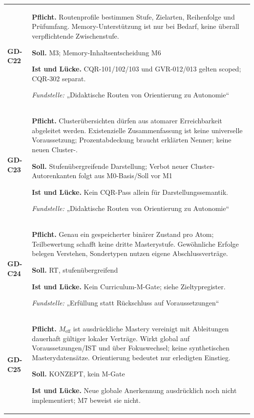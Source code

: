 \begin{longtable}{@{}P{20mm}P{128mm}@{}}
\label{rule:GD-C22}\textbf{GD-C22} &
\textbf{Pflicht.} Routenprofile bestimmen Stufe, Zielarten, Reihenfolge und Prüfumfang. Memory-Unterstützung ist nur bei Bedarf, keine überall verpflichtende Zwischenstufe.\par\smallskip
\textbf{Soll.} M3; Memory-Inhaltsentscheidung M6\par\smallskip
\textbf{Ist und Lücke.} CQR-101/102/103 und GVR-012/013 gelten scoped; CQR-302 separat.\par\smallskip
\emph{Fundstelle:} „Didaktische Routen von Orientierung zu Autonomie“\\\addlinespace[5pt]
\label{rule:GD-C23}\textbf{GD-C23} &
\textbf{Pflicht.} Clusterübersichten dürfen aus atomarer Erreichbarkeit abgeleitet werden. Existenzielle Zusammenfassung ist keine universelle Voraussetzung; Prozentabdeckung braucht erklärten Nenner; keine neuen Cluster-.\par\smallskip
\textbf{Soll.} Stufenübergreifende Darstellung; Verbot neuer Cluster-Autorenkanten folgt aus M0-Basis/Soll vor M1\par\smallskip
\textbf{Ist und Lücke.} Kein CQR-Pass allein für Darstellungssemantik.\par\smallskip
\emph{Fundstelle:} „Didaktische Routen von Orientierung zu Autonomie“\\\addlinespace[5pt]
\label{rule:GD-C24}\textbf{GD-C24} &
\textbf{Pflicht.} Genau ein gespeicherter binärer Zustand pro Atom; Teilbewertung schafft keine dritte Masterystufe. Gewöhnliche Erfolge belegen Verstehen, Sondertypen nutzen eigene Abschlussverträge.\par\smallskip
\textbf{Soll.} RT, stufenübergreifend\par\smallskip
\textbf{Ist und Lücke.} Kein Curriculum-M-Gate; siehe Zieltypregister.\par\smallskip
\emph{Fundstelle:} „Erfüllung statt Rückschluss auf Voraussetzungen“\\\addlinespace[5pt]
\label{rule:GD-C25}\textbf{GD-C25} &
\textbf{Pflicht.} \(M_{\mathrm{eff}}\) ist ausdrückliche Mastery vereinigt mit Ableitungen dauerhaft gültiger lokaler Verträge. Wirkt global auf Voraussetzungen/IST und über Fokuswechsel; keine synthetischen Masterydatensätze. Orientierung bedeutet nur erledigten Einstieg.\par\smallskip
\textbf{Soll.} KONZEPT, kein M-Gate\par\smallskip
\textbf{Ist und Lücke.} Neue globale Anerkennung ausdrücklich noch nicht implementiert; M7 beweist sie nicht.\par\smallskip

\end{longtable}
